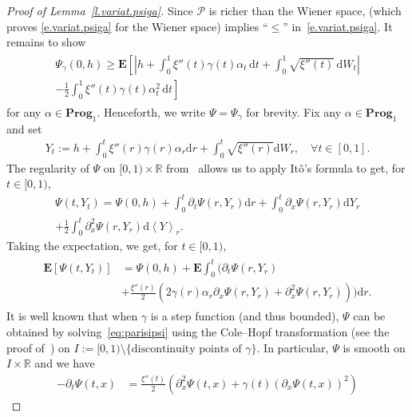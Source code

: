 \documentclass[11pt]{amsart}
\theoremstyle{remark}
\theoremstyle{definition}
\numberwithin{equation}{section}
\numberwithin{proposition}{section}
\numberwithin{figure}{section}
\numberwithin{table}{section}
\newcommand{\R}{\mathbb{R}}
\newcommand{\EE}{\mathbf{E}}
\renewcommand{\leq}{\leqslant}
\renewcommand{\geq}{\geqslant}
\newcommand{\Ll}{\left}
\newcommand{\Rr}{\right}
\renewcommand{\d}{\mathrm{d}}
\newcommand{\1}{\mathbf{1}}
\newcommand{\msc}{\mathscr}
\newcommand{\ga}{\gamma}
\newcommand{\la}{\left\langle}
\newcommand{\ra}{\right\rangle}
\newcommand{\bprog}{\mathbf{Prog}}
\begin{document}
\begin{proof}[Proof of Lemma~\ref{l.variat.psiga}]
Since $\msc P$ is richer than the Wiener space, \cite[Theorem~5]{chen2018energy} (which proves \eqref{e.variat.psiga} for the Wiener space) implies ``$\leq$'' in~\eqref{e.variat.psiga}. It remains to show
\begin{align}\label{e.variat.psiga_lb}
\begin{split}
    \Psi_\gamma(0,h)\geq \EE \left[ 
\left|h+\int_{0}^{1}\xi''(t)\ga(t)\alpha_t \, \mathrm{d}t+\int_0^1\sqrt{\xi''(t)}\, \mathrm{d} W_t\right| \right. \\
\left. - \frac{1}{2}\int_{0}^{1}\xi''(t)\gamma(t)\alpha^{2}_t\, \mathrm{d}t \right]
\end{split}
\end{align}
for any $\alpha\in \bprog_1$. 
Henceforth, we write $\Psi=\Psi_\gamma$ for brevity.
Fix any $\alpha\in\bprog_1$ and set
\begin{align}\label{e.Y=}
    Y_t := h + \int_0^t \xi''(r)\gamma(r)\alpha_r\d r+ \int_0^t \sqrt{\xi''(r)}\d W_r,\quad\forall t\in[0,1].
\end{align}
The regularity of $\Psi$ on $[0,1)\times \R$ from~\cite[Proposition~2]{chen2018energy} allows us to apply Itô's formula to get, for $t\in[0,1)$,
\begin{align*}
    \Psi(t,Y_t)=\Psi(0,h) + \int_0^t\partial_t \Psi(r,Y_r)\d r+ \int_0^t \partial_x \Psi(r,Y_r)\d Y_r \\
    + \frac{1}{2}\int_0^t \partial^2_x\Psi(r,Y_r)\d \la Y\ra_r.
\end{align*}
Taking the expectation, we get, for $t\in[0,1)$,
\begin{align}\label{e.E[]=Psi+E...}
\begin{split}
    \EE \Ll[\Psi(t,Y_t)\Rr] &= \Psi(0,h)+\EE\int_0^t\Big(\partial_t\Psi(r,Y_r)
    \\
    &+\frac{\xi''(r)}{2}\Ll(2\gamma(r)\alpha_r\partial_x\Psi(r,Y_r)+\partial^2_x\Psi(r,Y_r)\Rr)\Big)\d r.
\end{split}
\end{align}
It is well known that when $\gamma$ is a step function (and thus bounded), $\Psi$ can be obtained by solving~\eqref{eq:parisipsi} using the Cole--Hopf transformation (see the proof of~\cite[Lemma~11]{chen2018energy}) on $I:=[0,1)\setminus\{\text{discontinuity points of $\gamma$}\}$. In particular, $\Psi$ is smooth on $I\times \R$ and we have
\begin{align*}
    -\partial_t \Psi(t,x) 
    & = \frac{\xi''(t)}{2} \Ll( \partial_{x}^2 \Psi(t,x) + \ga(t) ( \partial_x \Psi(t,x) )^2\Rr)

\end{align*}
\end{proof}
\end{document}
